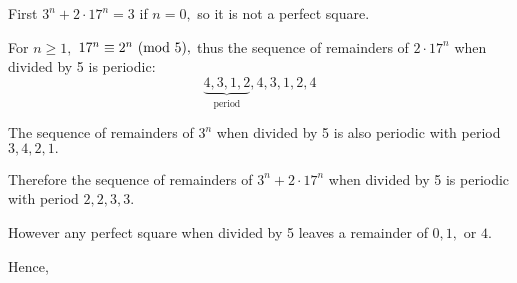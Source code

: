 \documentclass{article}
\begin{document}
\begin{soln}[Solution 2]
    First $3^n + 2\cdot 17^n = 3$ if $n=0,$ so it is not a perfect square.
    
    For $n \ge 1,$ $17^n \equiv 2^n \ (\mathrm{mod}\ 5),$ thus the sequence of remainders of $2\cdot 17^n$ when divided by 5 is periodic:
    \[
        \underbrace{4, 3, 1, 2}_{\text{period}}, 4, 3, 1, 2, 4
    \]

    The sequence of remainders of $3^n$ when divided by 5 is also periodic with period $3, 4, 2, 1.$
    
    Therefore the sequence of remainders of $3^n + 2\cdot 17^n$ when divided by 5 is periodic with period $2, 2, 3, 3.$

    However any perfect square when divided by 5 leaves a remainder of $0, 1,$ or $4.$ 

    Hence, 
\end{soln}
\end{document}
